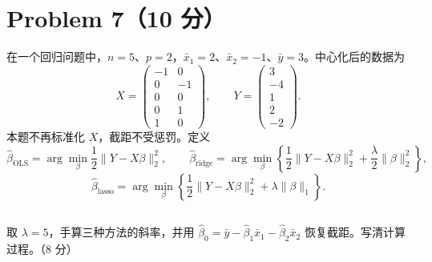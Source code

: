\documentclass[12pt,a4paper]{article}
\begin{document}
\section{Problem 7（10 分）}

在一个回归问题中，$n=5$、$p=2$，$\bar{x}_1=2$、$\bar{x}_2=-1$、$\bar{y}=3$。中心化后的数据为
\[
X=\begin{pmatrix}
-1 & 0 \\
0 & -1 \\
0 & 0 \\
0 & 1 \\
1 & 0
\end{pmatrix},\qquad
Y=\begin{pmatrix}
3 \\ -4 \\ 1 \\ 2 \\ -2
\end{pmatrix}.
\]
本题不再标准化 $X$，截距不受惩罚。定义
\[
\hat{\beta}_{\mathrm{OLS}}=\arg\min_{\beta}\frac{1}{2}\lVert Y-X\beta\rVert_2^2,\qquad
\hat{\beta}_{\mathrm{ridge}}=\arg\min_{\beta}\left\{\frac{1}{2}\lVert Y-X\beta\rVert_2^2+\frac{\lambda}{2}\lVert\beta\rVert_2^2\right\},
\]
\[
\hat{\beta}_{\mathrm{lasso}}=\arg\min_{\beta}\left\{\frac{1}{2}\lVert Y-X\beta\rVert_2^2+\lambda\lVert\beta\rVert_1\right\}.
\]

\subsection{}

取 $\lambda=5$，手算三种方法的斜率，并用 $\hat{\beta}_0=\bar{y}-\hat{\beta}_1\bar{x}_1-\hat{\beta}_2\bar{x}_2$ 恢复截距。写清计算过程。（8 分）
\end{document}
